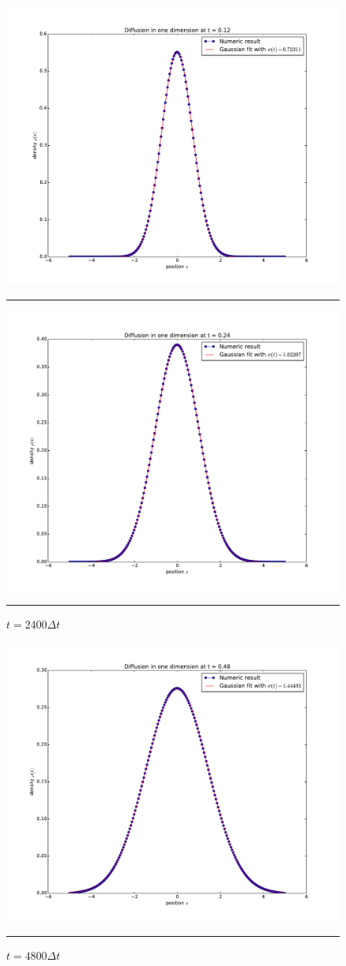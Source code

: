 \documentclass[notitlepage,aps,prd,nofootinbib]{revtex4-1}
\begin{document}
\newpage
\begin{figure}[!htbc]
  \centering
  \includegraphics[width=.6\textwidth]{../output/plots_for_paper/part_b_1200.pdf}
  	{\par\nobreak\rule[9pt]{35em}{0.5pt}\vspace{-5mm}}
	\caption{$t = 1200\Delta t$}
	\label{fig:part_b_4}
  \includegraphics[width=.6\textwidth]{../output/plots_for_paper/part_b_2400.pdf}
  	{\par\nobreak\rule[9pt]{35em}{0.5pt}\vspace{-5mm}}
	\caption{$t = 2400\Delta t$}
	\label{fig:part_b_4}
\end{figure}

\newpage
\begin{figure}[!htbc]
  \centering
  \includegraphics[width=.6\textwidth]{../output/plots_for_paper/part_b_4800.pdf}
  	{\par\nobreak\rule[9pt]{35em}{0.5pt}\vspace{-5mm}}
	\caption{$t = 4800\Delta t$}
	\label{fig:part_b_5}
\end{figure}
\newline
\end{document}

